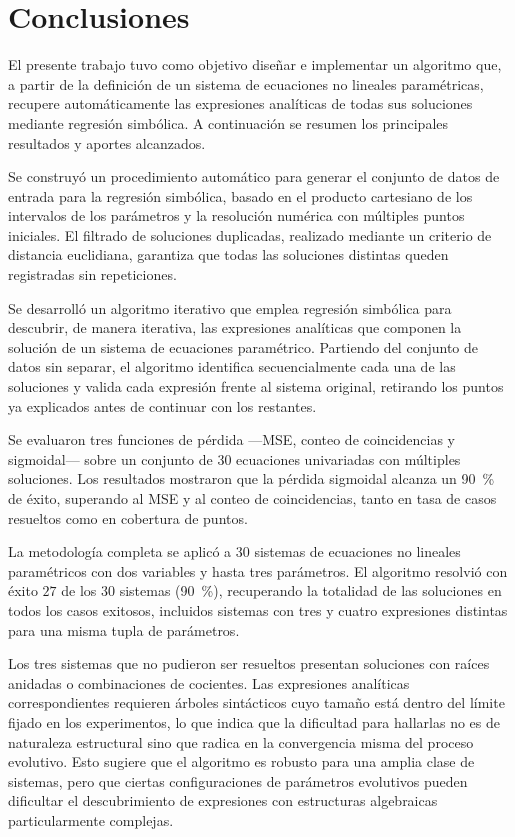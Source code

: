 \chapter{Conclusiones}\label{chap:conclusiones}

El presente trabajo tuvo como objetivo diseñar e implementar un algoritmo que, a partir de la definición de un sistema de ecuaciones no lineales paramétricas, recupere automáticamente las expresiones analíticas de todas sus soluciones mediante regresión simbólica. A continuación se resumen los principales resultados y aportes alcanzados.

Se construyó un procedimiento automático para generar el conjunto de datos de entrada para la regresión simbólica, basado en el producto cartesiano de los intervalos de los parámetros y la resolución numérica con múltiples puntos iniciales. El filtrado de soluciones duplicadas, realizado mediante un criterio de distancia euclidiana, garantiza que todas las soluciones distintas queden registradas sin repeticiones.

Se desarrolló un algoritmo iterativo que emplea regresión simbólica para descubrir, de manera iterativa, las expresiones analíticas que componen la solución de un sistema de ecuaciones paramétrico. Partiendo del conjunto de datos sin separar, el algoritmo identifica secuencialmente cada una de las soluciones y valida cada expresión frente al sistema original, retirando los puntos ya explicados antes de continuar con los restantes.

Se evaluaron tres funciones de pérdida —MSE, conteo de coincidencias y sigmoidal— sobre un conjunto de $30$ ecuaciones univariadas con múltiples soluciones. Los resultados mostraron que la pérdida sigmoidal alcanza un 90~\% de éxito, superando al MSE y al conteo de coincidencias, tanto en tasa de casos resueltos como en cobertura de puntos.

La metodología completa se aplicó a $30$ sistemas de ecuaciones no lineales paramétricos con dos variables y hasta tres parámetros. El algoritmo resolvió con éxito $27$ de los $30$ sistemas (90~\%), recuperando la totalidad de las soluciones en todos los casos exitosos, incluidos sistemas con tres y cuatro expresiones distintas para una misma tupla de parámetros.

Los tres sistemas que no pudieron ser resueltos presentan soluciones con raíces anidadas o combinaciones de cocientes. Las expresiones analíticas correspondientes requieren árboles sintácticos cuyo tamaño está dentro del límite fijado en los experimentos, lo que indica que la dificultad para hallarlas no es de naturaleza estructural sino que radica en la convergencia misma del proceso evolutivo. Esto sugiere que el algoritmo es robusto para una amplia clase de sistemas, pero que ciertas configuraciones de parámetros evolutivos pueden dificultar el descubrimiento de expresiones con estructuras algebraicas particularmente complejas.

